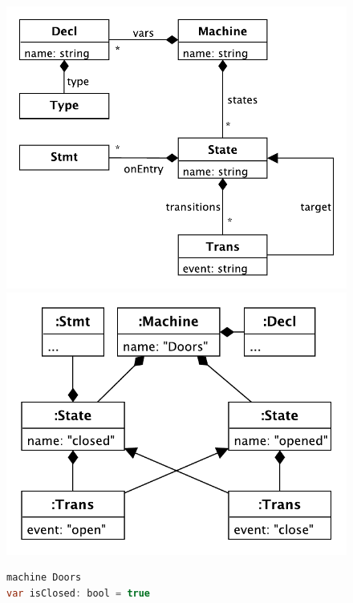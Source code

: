 \documentclass[english,submission]{programming}
\begin{document}
\begin{figure}[t]
\begin{adjustwidth}{-3em}{-3em}
\begin{minipage}{0.4\textwidth}
\includegraphics[width=\textwidth]{figures/metamodel.pdf}
\end{minipage}
\hspace*{2pt}
\vline
\begin{minipage}{0.4\textwidth}
  \includegraphics[width=\textwidth]{figures/doors-ast.pdf}
  \end{minipage}
\hspace*{2pt}
\vline
\begin{minipage}{0.3\textwidth}
  \begin{lstlisting}[language=java,morekeywords={machine,on,state,var},basicstyle=\footnotesize,numbers=none]
machine Doors
var isClosed: bool = true


\end{lstlisting}
\end{minipage}
\end{adjustwidth}
\end{figure}
\end{document}
